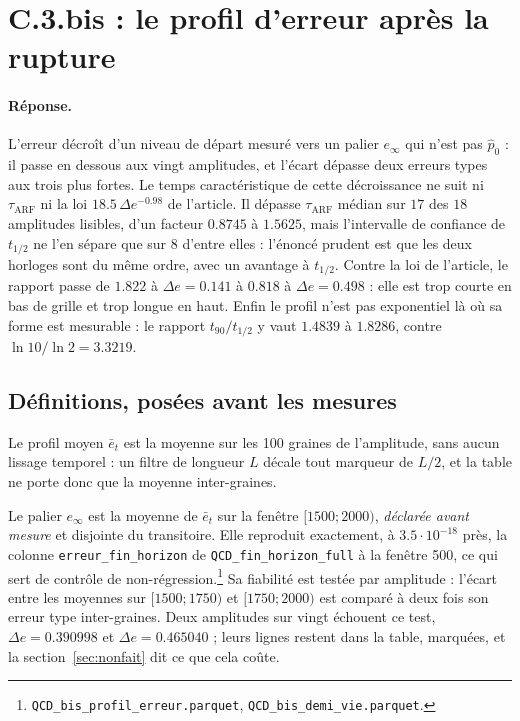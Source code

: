 \documentclass[11pt,a4paper]{article}
\begin{document}
\section{C.3.bis : le profil d'erreur après la rupture}

\paragraph{Réponse.} L'erreur décroît d'un niveau de départ mesuré vers un palier $e_\infty$
qui n'est pas $\hat{p}_0$ : il passe en dessous aux vingt amplitudes, et l'écart dépasse deux
erreurs types aux trois plus fortes. Le temps caractéristique de cette décroissance ne suit
ni $\tau_{\mathrm{ARF}}$ ni la loi $18.5\,\Delta e^{-0.98}$ de l'article. Il dépasse
$\tau_{\mathrm{ARF}}$ médian sur $17$ des $18$ amplitudes lisibles, d'un facteur $0.8745$ à
$1.5625$, mais l'intervalle de confiance de $t_{1/2}$ ne l'en sépare que sur $8$ d'entre
elles : l'énoncé prudent est que les deux horloges sont du même ordre, avec un avantage à
$t_{1/2}$. Contre la loi de l'article, le rapport passe de $1.822$ à $\Delta e = 0.141$ à
$0.818$ à $\Delta e = 0.498$ : elle est trop courte en bas de grille et trop longue en haut.
Enfin le profil n'est pas exponentiel là où sa forme est mesurable : le rapport
$t_{90}/t_{1/2}$ y vaut $1.4839$ à $1.8286$, contre $\ln 10 / \ln 2 = 3.3219$.

\subsection{Définitions, posées avant les mesures}

Le profil moyen $\bar{e}_t$ est la moyenne sur les 100 graines de l'amplitude, sans aucun
lissage temporel : un filtre de longueur $L$ décale tout marqueur de $L/2$, et la table ne
porte donc que la moyenne inter-graines.

Le palier $e_\infty$ est la moyenne de $\bar{e}_t$ sur la fenêtre $[1500 ; 2000)$,
\emph{déclarée avant mesure} et disjointe du transitoire. Elle reproduit exactement, à
$3.5 \cdot 10^{-18}$ près, la colonne \texttt{erreur\_fin\_horizon} de
\texttt{QCD\_fin\_horizon\_full} à la fenêtre 500, ce qui sert de contrôle de
non-régression.\footnote{\texttt{QCD\_bis\_profil\_erreur.parquet},
\texttt{QCD\_bis\_demi\_vie.parquet}.} Sa fiabilité est testée par amplitude : l'écart entre
les moyennes sur $[1500 ; 1750)$ et $[1750 ; 2000)$ est comparé à deux fois son erreur type
inter-graines. Deux amplitudes sur vingt échouent ce test, $\Delta e = 0.390998$ et
$\Delta e = 0.465040$ ; leurs lignes restent dans la table, marquées, et la
section~\ref{sec:nonfait} dit ce que cela coûte.
\end{document}

